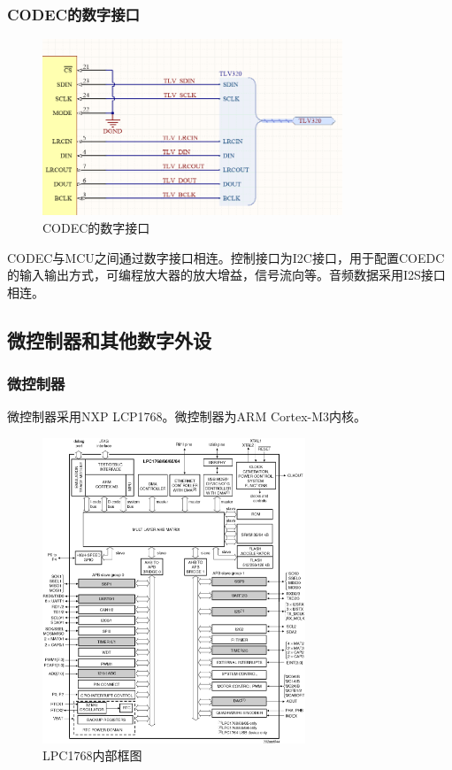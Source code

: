 \documentclass[16pt,a4paper]{article}
\begin{document}
\subsubsection{CODEC的数字接口}
\begin{figure}[H]
\centering
\includegraphics[width=0.8\textwidth]{DI.png}
\caption{CODEC的数字接口} 
\end{figure}
CODEC与MCU之间通过数字接口相连。控制接口为I2C接口，用于配置COEDC的输入输出方式，可编程放大器的放大增益，信号流向等。音频数据采用I2S接口相连。

\subsection{微控制器和其他数字外设}
\subsubsection{微控制器}
微控制器采用NXP LCP1768。微控制器为ARM Cortex-M3内核。
\begin{figure}[H]
\centering
\includegraphics[width=0.7\textwidth]{LPC1768.png}
\caption{LPC1768内部框图} 
\end{figure}
\end{document}
